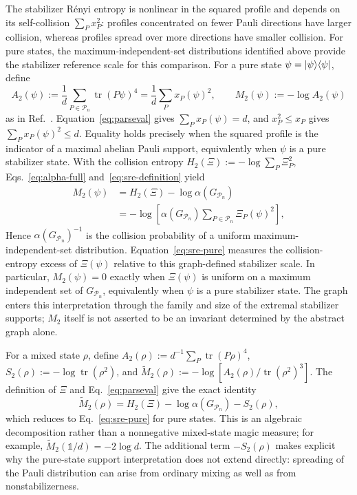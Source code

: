 \documentclass[10pt,aps,pra,twocolumn,floatfix,nofootinbib,superscriptaddress,longbibliography]{revtex4-2}
\newcommand{\Pcal}{\mathcal P}
\renewcommand{\tr}{\operatorname{tr}}
\begin{document}
\begin{bibunit}[apsrev4-2]
		The stabilizer R\'enyi entropy is nonlinear in the squared profile and depends on its self-collision $\sum_Px_P^2$: profiles concentrated on fewer Pauli directions have larger collision, whereas profiles spread over more directions have smaller collision. For pure states, the maximum-independent-set distributions identified above provide the stabilizer reference scale for this comparison.
		For a pure state $\psi=\ket{\psi}\!\bra{\psi}$, define
		\begin{equation}
			A_2(\psi):=\frac1d\sum_{P\in\Pcal_n}\tr(P\psi)^4=\frac1d\sum_Px_P(\psi)^2,
			\qquad M_2(\psi):=-\log A_2(\psi)
			\label{eq:sre-definition}
		\end{equation}
		as in Ref.~\cite{leone2022stabilizer}.
		Equation~\eqref{eq:parseval} gives $\sum_Px_P(\psi)=d$, and $x_P^2\le x_P$ gives $\sum_Px_P(\psi)^2\le d$.
		Equality holds precisely when the squared profile is the indicator of a maximal abelian Pauli support, equivalently when $\psi$ is a pure stabilizer state.
		With the collision entropy $H_2(\Xi):=-\log\sum_P\Xi_P^2$, Eqs.~\eqref{eq:alpha-full} and~\eqref{eq:sre-definition} yield
		\begin{equation}
			\begin{aligned}
				M_2(\psi)
				&=H_2(\Xi)-\log\alpha(G_{\Pcal_n})\\
				&=-\log\!\left[\alpha(G_{\Pcal_n})\sum_{P\in\Pcal_n}\Xi_P(\psi)^2\right],
			\end{aligned}
			\label{eq:sre-pure}
		\end{equation}
		Hence $\alpha(G_{\Pcal_n})^{-1}$ is the collision probability of a uniform maximum-independent-set distribution. Equation~\eqref{eq:sre-pure} measures the collision-entropy excess of $\Xi(\psi)$ relative to this graph-defined stabilizer scale. In particular, $M_2(\psi)=0$ exactly when $\Xi(\psi)$ is uniform on a maximum independent set of $G_{\Pcal_n}$, equivalently when $\psi$ is a pure stabilizer state. The graph enters this interpretation through the family and size of the extremal stabilizer supports; $M_2$ itself is not asserted to be an invariant determined by the abstract graph alone.
		
		For a mixed state $\rho$, define $A_2(\rho):=d^{-1}\sum_P\tr(P\rho)^4$, $S_2(\rho):=-\log\tr(\rho^2)$, and $\widetilde M_2(\rho):=-\log[A_2(\rho)/\tr(\rho^2)^3]$.
		The definition of $\Xi$ and Eq.~\eqref{eq:parseval} give the exact identity
		\begin{equation}
			\widetilde M_2(\rho)=H_2(\Xi)-\log\alpha(G_{\Pcal_n})-S_2(\rho),
			\label{eq:sre-mixed}
		\end{equation}
		which reduces to Eq.~\eqref{eq:sre-pure} for pure states.
		This is an algebraic decomposition rather than a nonnegative mixed-state magic measure; for example, $\widetilde M_2(\mathbb{1}/d)=-2\log d$.
		The additional term $-S_2(\rho)$ makes explicit why the pure-state support interpretation does not extend directly: spreading of the Pauli distribution can arise from ordinary mixing as well as from nonstabilizerness.
		

\end{bibunit}
\end{document}
